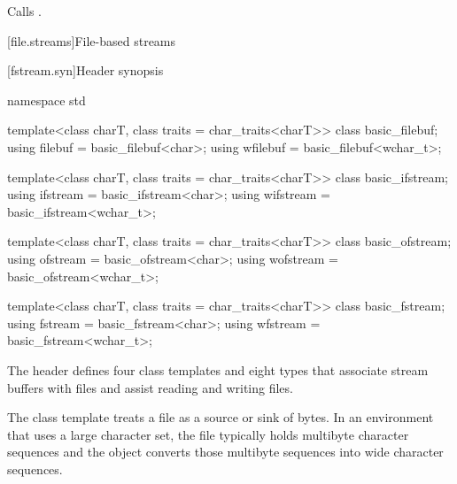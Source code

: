 \begin{itemdescr}
\pnum
\effects
Calls
.
\end{itemdescr}

[file.streams]{File-based streams}

[fstream.syn]{Header  synopsis}
%
%
%
%
%
%
%
%
%
%
%
%
%
%
%
%
%
\begin{codeblock}
namespace std {
  template<class charT, class traits = char_traits<charT>>
    class basic_filebuf;
  using filebuf  = basic_filebuf<char>;
  using wfilebuf = basic_filebuf<wchar_t>;

  template<class charT, class traits = char_traits<charT>>
    class basic_ifstream;
  using ifstream  = basic_ifstream<char>;
  using wifstream = basic_ifstream<wchar_t>;

  template<class charT, class traits = char_traits<charT>>
    class basic_ofstream;
  using ofstream  = basic_ofstream<char>;
  using wofstream = basic_ofstream<wchar_t>;

  template<class charT, class traits = char_traits<charT>>
    class basic_fstream;
  using fstream  = basic_fstream<char>;
  using wfstream = basic_fstream<wchar_t>;
}
\end{codeblock}

\pnum
The header
defines four class templates and eight types
that associate stream buffers with files and assist
reading and writing files.

\pnum
\begin{note} The class template  treats a file as a source or
sink of bytes. In an environment that uses a large character set, the file
typically holds multibyte character sequences and the 
object converts those multibyte sequences into wide character sequences.
\end{note}

